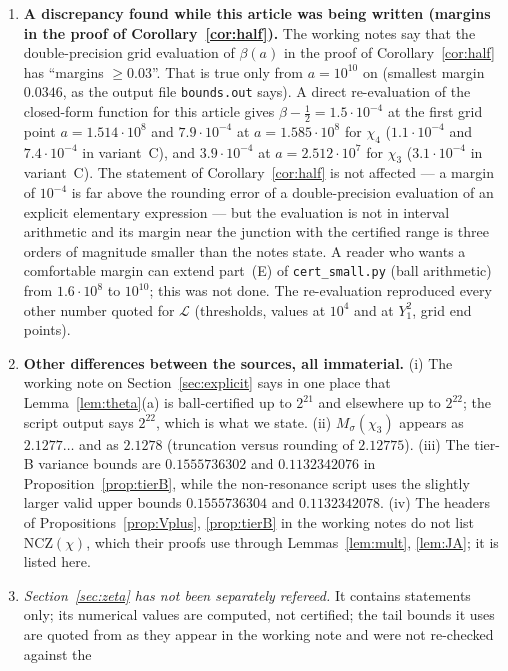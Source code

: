 \documentclass[11pt]{amsart}
\theoremstyle{definition}
\numberwithin{equation}{section}
\newcommand{\cL}{\mathcal L}          %
\begin{document}
\begin{enumerate}
\item\label{gap:margin} \textbf{A discrepancy found while this
article was being written (margins in the proof of
Corollary~\ref{cor:half}).} The working notes say that the
double-precision grid evaluation of $\beta(a)$ in the proof of
Corollary~\ref{cor:half} has ``margins $\ge0.03$''. That is true
only from $a=10^{10}$ on (smallest margin $0.0346$, as the output
file \texttt{bounds.out} says). A direct re-evaluation of the
closed-form function for this article gives
$\beta-\tfrac12=1.5\cdot10^{-4}$ at the first grid point
$a=1.514\cdot10^8$ and $7.9\cdot10^{-4}$ at $a=1.585\cdot10^8$ for
$\chi_4$ ($1.1\cdot10^{-4}$ and $7.4\cdot10^{-4}$ in variant~C), and
$3.9\cdot10^{-4}$ at $a=2.512\cdot10^7$ for $\chi_3$
($3.1\cdot10^{-4}$ in variant~C). The statement of
Corollary~\ref{cor:half} is not affected --- a margin of $10^{-4}$ is
far above the rounding error of a double-precision evaluation of an
explicit elementary expression --- but the evaluation is not in
interval arithmetic and its margin near the junction with the
certified range is three orders of magnitude smaller than the notes
state. A reader who wants a comfortable margin can extend part~(E) of
\texttt{cert\_small.py} (ball arithmetic) from $1.6\cdot10^8$ to
$10^{10}$; this was not done. The re-evaluation reproduced every
other number quoted for $\cL$ (thresholds, values at $10^4$ and at
$Y_1^2$, grid end points).
\item \textbf{Other differences between the sources, all immaterial.}
(i) The working note on Section~\ref{sec:explicit} says in one place
that Lemma~\ref{lem:theta}(a) is ball-certified up to $2^{21}$ and
elsewhere up to $2^{22}$; the script output says $2^{22}$, which is
what we state. (ii) $M_\sigma(\chi_3)$ appears as $2.1277\ldots$ and
as $2.1278$ (truncation versus rounding of $2.12775$). (iii) The
tier-B variance bounds are $0.1555736302$ and $0.1132342076$ in
Proposition~\ref{prop:tierB}, while the non-resonance script uses the
slightly larger valid upper bounds $0.1555736304$ and
$0.1132342078$. (iv) The headers of
Propositions~\ref{prop:Vplus}, \ref{prop:tierB} in the working notes
do not list NCZ$(\chi)$, which their proofs use through
Lemmas~\ref{lem:mult}, \ref{lem:JA}; it is listed here.
\item \emph{Section~\ref{sec:zeta} has not been separately refereed.}
It contains statements only; its numerical values are computed, not
certified; the tail bounds it uses are quoted from \cite{Tru14} as
they appear in the working note and were not re-checked against the

\end{enumerate}
\end{document}
